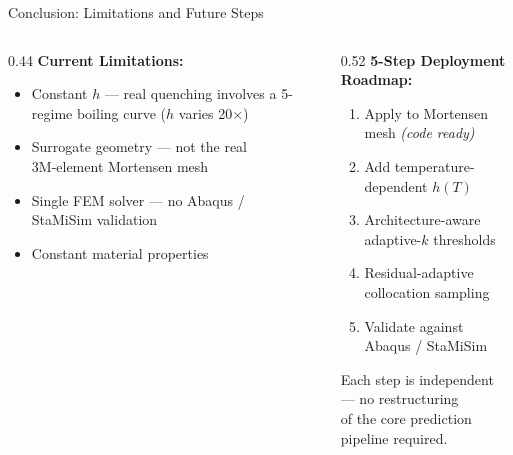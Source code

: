 \documentclass[aspectratio=169, 11pt]{beamer}
\begin{document}
\begin{frame}{Conclusion: Limitations and Future Steps}
  \begin{columns}[t]
    \begin{column}{0.44\textwidth}
      \textbf{Current Limitations:}
      \vspace{4pt}
      \begin{itemize}\itemsep5pt
        \item Constant $h$ — real quenching involves a
              5-regime boiling curve ($h$ varies 20$\times$)
        \item Surrogate geometry — not the real\\
              3M-element Mortensen mesh
        \item Single FEM solver — no Abaqus /\\
              StaMiSim validation
        \item Constant material properties
      \end{itemize}
    \end{column}
    \begin{column}{0.52\textwidth}
      \textbf{5-Step Deployment Roadmap:}
      \vspace{4pt}
      \begin{enumerate}\itemsep5pt
        \item Apply to Mortensen mesh \textit{(code ready)}
        \item Add temperature-dependent $h(T)$
        \item Architecture-aware adaptive-$k$ thresholds
        \item Residual-adaptive collocation sampling
        \item Validate against Abaqus / StaMiSim
      \end{enumerate}
      \vspace{6pt}
      \begin{block}{}
        \centering\small
        Each step is independent — no restructuring\\
        of the core prediction pipeline required.
      \end{block}
    \end{column}
  \end{columns}
\end{frame}
\end{document}
